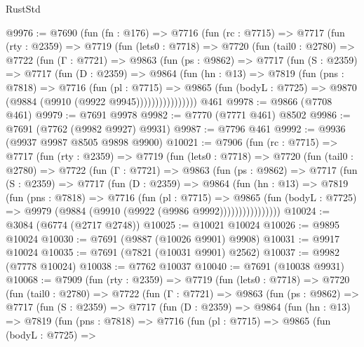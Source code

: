 \begin{lexlean}{RustStd}
\begin{coremodule}
@9976 := @7690
    (fun (fn : @176) =>
    @7716
      (fun (rc : @7715) =>
      @7717
        (fun (rty : @2359) =>
        @7719
          (fun (lets0 : @7718) =>
          @7720
            (fun (tail0 : @2780) =>
            @7722
              (fun (Γ : @7721) =>
              @9863
                (fun (ps : @9862) =>
                @7717
                  (fun (S : @2359) =>
                  @7717
                    (fun (D : @2359) =>
                    @9864
                      (fun (hn : @13) =>
                      @7819
                        (fun (pns : @7818) =>
                        @7716
                          (fun (pl : @7715) =>
                          @9865
                            (fun (bodyL : @7725) => @9870 (@9884 (@9910 (@9922 @9945))))))))))))))))
    @461
@9978 := @9866 (@7708 @461)
@9979 := @7691 @9978
@9982 := @7770 (@7771 @461) @8502
@9986 := @7691 (@7762 (@9982 @9927) @9931)
@9987 := @7796 @461
@9992 := @9936 (@9937 @9987 @8505 @9898 @9900)
@10021 := @7906
    (fun (rc : @7715) =>
    @7717
      (fun (rty : @2359) =>
      @7719
        (fun (lets0 : @7718) =>
        @7720
          (fun (tail0 : @2780) =>
          @7722
            (fun (Γ : @7721) =>
            @9863
              (fun (ps : @9862) =>
              @7717
                (fun (S : @2359) =>
                @7717
                  (fun (D : @2359) =>
                  @9864
                    (fun (hn : @13) =>
                    @7819
                      (fun (pns : @7818) =>
                      @7716
                        (fun (pl : @7715) =>
                        @9865
                          (fun (bodyL : @7725) =>
                          @9979 (@9884 (@9910 (@9922 (@9986 @9992))))))))))))))))
@10024 := @3084 (@6774 (@2717 @2748))
@10025 := @10021 @10024
@10026 := @9895 @10024
@10030 := @7691 (@9887 (@10026 @9901) @9908)
@10031 := @9917 @10024
@10035 := @7691 (@7821 (@10031 @9901) @2562)
@10037 := @9982 (@7778 @10024)
@10038 := @7762 @10037
@10040 := @7691 (@10038 @9931)
@10068 := @7909
    (fun (rty : @2359) =>
    @7719
      (fun (lets0 : @7718) =>
      @7720
        (fun (tail0 : @2780) =>
        @7722
          (fun (Γ : @7721) =>
          @9863
            (fun (ps : @9862) =>
            @7717
              (fun (S : @2359) =>
              @7717
                (fun (D : @2359) =>
                @9864
                  (fun (hn : @13) =>
                  @7819
                    (fun (pns : @7818) =>
                    @7716
                      (fun (pl : @7715) =>
                      @9865
                        (fun (bodyL : @7725) =>

\end{coremodule}
\end{lexlean}
